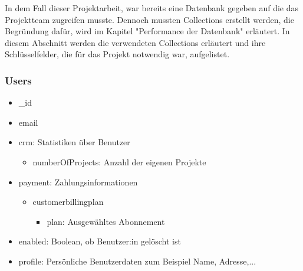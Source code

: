 In dem Fall dieser Projektarbeit, war bereits eine Datenbank gegeben auf die das Projektteam zugreifen musste. Dennoch mussten Collections erstellt werden, die Begründung dafür, wird im Kapitel "Performance der Datenbank" erläutert. In diesem Abschnitt werden die verwendeten Collections erläutert und ihre Schlüsselfelder, die für das Projekt notwendig war, aufgelistet.

\subsubsection{Users}
\begin{itemize}
    \item \_id
    \item email
    \item crm: Statistiken über Benutzer
        \begin{itemize}
            \item numberOfProjects: Anzahl der eigenen Projekte
        \end{itemize}
    \item payment: Zahlungsinformationen
        \begin{itemize}
            \item customerbillingplan
            \begin{itemize}
                \item plan: Ausgewähltes Abonnement
            \end{itemize}
        \end{itemize}
    \item enabled: Boolean, ob Benutzer:in gelöscht ist
    \item profile: Persönliche Benutzerdaten zum Beispiel Name, Adresse,...
\end{itemize}


